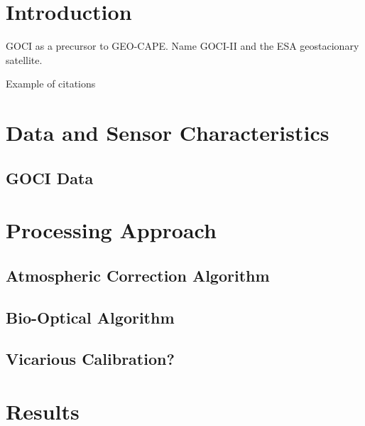 \documentclass[12pt]{spieman}  %
\begin{document}
\begin{spacing}{2}   %

\section{Introduction}
GOCI as a precursor to GEO-CAPE. 
Name GOCI-II and the ESA geostacionary satellite.

Example of citations\cite{Ryu2011,He2013,Hu2016}


\section{Data and Sensor Characteristics}
\subsection{GOCI Data}
\section{Processing Approach}
\subsection{Atmospheric Correction Algorithm}

\subsection{Bio-Optical Algorithm}
\subsection{Vicarious Calibration?}

\section{Results}
\label{sec:Results}

\end{spacing}
\end{document}
